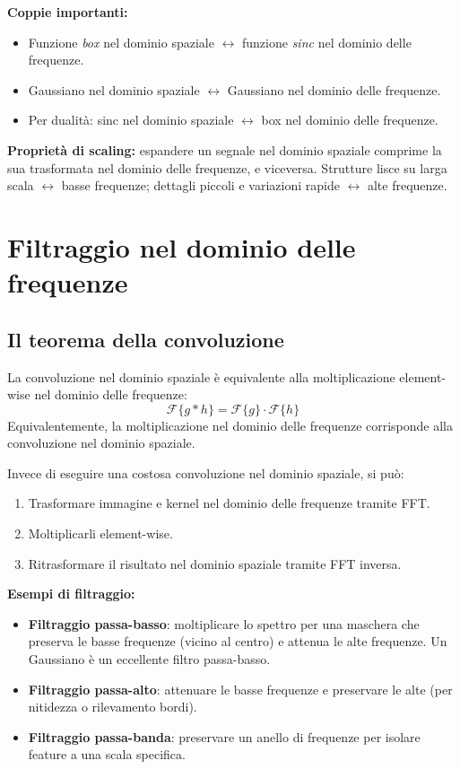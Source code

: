 \documentclass[12pt, a4paper]{report}
\begin{document}
\textbf{Coppie importanti:}
\begin{itemize}
  \item Funzione \emph{box} nel dominio spaziale $\leftrightarrow$ funzione
        \emph{sinc} nel dominio delle frequenze.
  \item Gaussiano nel dominio spaziale $\leftrightarrow$ Gaussiano nel dominio delle
        frequenze.
  \item Per dualità: sinc nel dominio spaziale $\leftrightarrow$ box nel dominio
        delle frequenze.
\end{itemize}

\textbf{Proprietà di scaling:} espandere un segnale nel dominio spaziale comprime
la sua trasformata nel dominio delle frequenze, e viceversa.  Strutture lisce su
larga scala $\leftrightarrow$ basse frequenze; dettagli piccoli e variazioni rapide
$\leftrightarrow$ alte frequenze.

\section{Filtraggio nel dominio delle frequenze}

\subsection{Il teorema della convoluzione}

\begin{propbox}
La convoluzione nel dominio spaziale è equivalente alla moltiplicazione
element-wise nel dominio delle frequenze:
\[
  \mathcal{F}\{g * h\} = \mathcal{F}\{g\} \cdot \mathcal{F}\{h\}
\]
Equivalentemente, la moltiplicazione nel dominio delle frequenze corrisponde alla
convoluzione nel dominio spaziale.
\end{propbox}

Invece di eseguire una costosa convoluzione nel dominio spaziale, si può:
\begin{enumerate}
  \item Trasformare immagine e kernel nel dominio delle frequenze tramite FFT.
  \item Moltiplicarli element-wise.
  \item Ritrasformare il risultato nel dominio spaziale tramite FFT inversa.
\end{enumerate}

\textbf{Esempi di filtraggio:}
\begin{itemize}
  \item \textbf{Filtraggio passa-basso}: moltiplicare lo spettro per una maschera
        che preserva le basse frequenze (vicino al centro) e attenua le alte
        frequenze.  Un Gaussiano è un eccellente filtro passa-basso.
  \item \textbf{Filtraggio passa-alto}: attenuare le basse frequenze e preservare le
        alte (per nitidezza o rilevamento bordi).
  \item \textbf{Filtraggio passa-banda}: preservare un anello di frequenze per
        isolare feature a una scala specifica.
\end{itemize}
\end{document}
